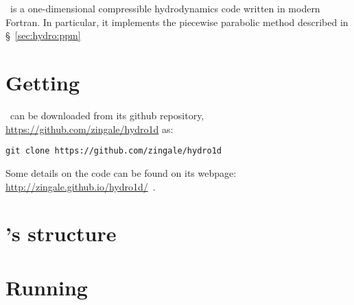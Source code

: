 \label{app:hydro1d}


\section{\hydrooned}

\hydrooned\ is a one-dimensional compressible hydrodynamics code written
in modern Fortran.  In particular, it implements the piecewise parabolic
method described in \S~\ref{sec:hydro:ppm}


\section{Getting \hydrooned}

\hydrooned\ can be downloaded from its github repository, \url{https://github.com/zingale/hydro1d} as:
\begin{verbatim}
git clone https://github.com/zingale/hydro1d
\end{verbatim}

Some details on the code can be found on its webpage:
\url{http://zingale.github.io/hydro1d/}\, .



\section{\hydrooned 's structure}



\section{Running \hydrooned}

